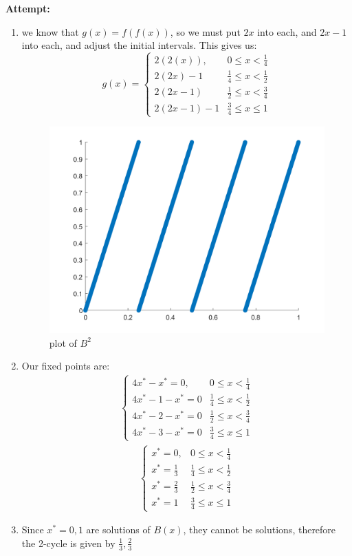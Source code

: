 \documentclass[12pt,letterpaper]{article}
\theoremstyle{definition}
\begin{document}
    
  \textbf{Attempt:}
    \begin{changemargin}{.5cm}{0cm}
    
    \begin{enumerate}[label=(\alph*)]
    \item
    we know that $g(x) = f(f(x))$, so we must put $2x$ into each, and $2x-1$ into each, and adjust the initial intervals. This gives us: \begin{equation*}
        g(x) = \begin{cases}
         2(2(x)), & 0\leq x < \frac 1 4\\
         2(2x)-1 & \frac 1 4 \leq x < \frac 1 2 \\
          2(2x-1)& \frac 1 2 \leq x < \frac 3 4\\
         2(2x-1)-1 & \frac 3 4 \leq x \leq 1
        \end{cases}
    \end{equation*}
    \begin{figure}[H]
        \centering
       \includegraphics[width=.6\textwidth]{images/problem_15_b2.png}
        \caption{plot of $B^2$}
        \label{fig:b2}
    \end{figure}
    
    \item Our fixed points are:
    \begin{align*}
         \begin{cases}
         4x^*-x^*=0, & 0\leq x < \frac 1 4\\
         4x^* -1 - x^* = 0 & \frac 1 4 \leq x < \frac 1 2 \\
         4x^*-2 - x^*=0 & \frac 1 2 \leq x < \frac 3 4\\
        4x^* -3-x^*=0 & \frac 3 4 \leq x \leq 1
        \end{cases}
    \end{align*}
    \begin{align*}
         \begin{cases}
         x^*=0, & 0\leq x < \frac 1 4\\
         x^*=\frac 1 3 & \frac 1 4 \leq x < \frac 1 2 \\
         x^*=\frac 2 3    & \frac 1 2 \leq x < \frac 3 4\\
         x^* = 1  & \frac 3 4 \leq x \leq 1
        \end{cases}
    \end{align*}
    \item Since $x^*=0,1$ are solutions of $B(x)$, they cannot be solutions, therefore the 2-cycle is given by $\frac{1}{3},\frac{2}{3}$
    

\end{enumerate}
\end{changemargin}
\end{document}
